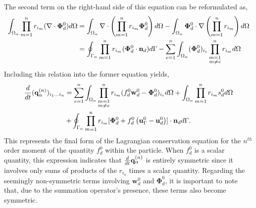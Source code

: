 The second term on the right-hand side of this equation can be reformulated as,
\begin{align*}
    \int_{\Omega_{\alpha}}  \prod_{m=1}^{n} r_{i_m} (\mathbf{\nabla}\cdot\bm\Phi_d^0)  d\Omega
    &= \int_{\Omega_{\alpha}}  \mathbf{\nabla}\cdot \left(\prod_{m=1}^{n} r_{i_m} \bm\Phi_d^0 \right) d\Omega
    - \int_{\Omega_{\alpha}}  \bm\Phi_d^0 \cdot \mathbf{\nabla} \left(\prod_{m=1}^{n} r_{i_m} \right) d\Omega\\
    &= \oint_{\Gamma_{\alpha}}  \prod_{m=1}^{n} r_{i_m} (\bm\Phi_d^0 \cdot \textbf{n}_d) d\Gamma
    -\sum_{e=1}^{n} 
    \int_{\Omega_{\alpha}}  (\bm\Phi_d^0)_{i_e}  \prod^{n}_{\substack{ m=1 \\m \neq e}} r_{i_m}   d\Omega
\end{align*}
Including this relation into the former equation yields, 
\begin{multline}
    \ddt {(\textbf{q}_\alpha^{(n)})_{i_1\ldots i_n}}
    = \sum_{e=1}^{n} 
    \intO{
        \prod^{n}_{\substack{ m=1 \\m \neq e}} r_{i_m} (f_d^0 \textbf{w}_d^0  - \bm\Phi_d^0)_{i_e}
    }
    + \intO{ \pri{1}{n} s_d^0 }\\
    +\intS{ \pri{1}{n} [\bm\Phi_d^0 + f_d^0 \left(\textbf{u}_\Gamma^0 - \textbf{u}_d^0\right)]\cdot \textbf{n}_d }.
    \label{eq:dt_q_n}
\end{multline}
This represents the final form of the Lagrangian conservation equation for the $n^{th}$ order moment of the quantity $f_d^0$ within the particle. 
When $f_d^0$ is a scalar quantity, this expression indicates that $\frac{d}{dt} \textbf{q}_\alpha^{(n)}$ is entirely symmetric since it involves only sums of products of the $r_{i_n}$ times a scalar quantity. 
Regarding the seemingly non-symmetric terms involving $\textbf{w}_d^0$ and $\bm\Phi_d^0$, it is important to note that, due to the summation operator's presence, these terms also become symmetric. 



